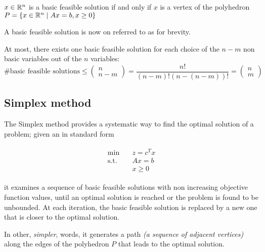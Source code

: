 \documentclass[english]{article}
\begin{document}
\bigskip
\begin{theorem}
  \(x \in \mathbb{R}^n\) is a basic feasible solution if and only if \(x\) is a vertex of the polyhedron \(P = \left\{ x \in \mathbb{R}^n \mid   Ax = b, x \geq 0 \right\}\)
\end{theorem}

\bigskip
A basic feasible solution is now on referred to as \BFS for brevity.

\bigskip
\begin{property}
  At most, there exists one basic feasible solution for each choice of the \(n-m\) non basic variables out of the \(n\) variables:
  \[\text{\# basic feasible solutions} \leq
    \begin{pmatrix}
      n \\ n-m
    \end{pmatrix}
    = \dfrac{n!}{\left( n - m \right)! \left( n - \left( n-m \right) \right)!} =
    \begin{pmatrix}
      n \\ m
    \end{pmatrix}
  \]
\end{property}

\subsection{Simplex method}

The Simplex method provides a systematic way to find the optimal solution of a \LP problem;
given an \LP in standard form

\begin{gather*}
  \begin{aligned}
    \min \quad        & z = c^T x \\
    \text{s.t.} \quad & Ax = b    \\
                      & x \geq 0
  \end{aligned}
\end{gather*}

it examines a sequence of basic feasible solutions with non increasing objective function values, until an optimal solution is reached or the problem is found to be unbounded.
At each iteration, the basic feasible solution is replaced by a new one that is closer to the optimal solution.

In other, \textit{simpler}, words, it generates a path \textit{(a sequence of adjacent vertices)} along the edges of the polyhedron \(P\) that leads to the optimal solution.
\end{document}
